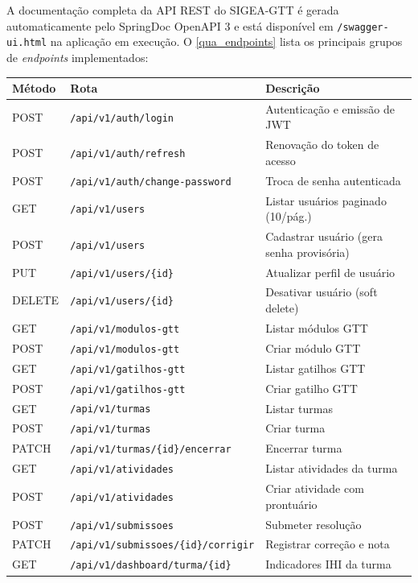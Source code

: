 \begin{apendicesenv}
A documentação completa da API REST do SIGEA-GTT é gerada automaticamente
pelo SpringDoc OpenAPI 3 e está disponível em \texttt{/swagger-ui.html}
na aplicação em execução. O \autoref{qua_endpoints} lista os principais
grupos de \textit{endpoints} implementados:

\begin{quadro}[htb]
\centering
\small
\caption{Principais endpoints da API REST do SIGEA-GTT.}
\label{qua_endpoints}
\begin{tabularx}{\textwidth}{l l X}
\toprule
\textbf{Método} & \textbf{Rota} & \textbf{Descrição} \\
\midrule
POST & \texttt{/api/v1/auth/login} & Autenticação e emissão de JWT \\
POST & \texttt{/api/v1/auth/refresh} & Renovação do token de acesso \\
POST & \texttt{/api/v1/auth/change-password} & Troca de senha autenticada \\
\midrule
GET  & \texttt{/api/v1/users} & Listar usuários paginado (10/pág.) \\
POST & \texttt{/api/v1/users} & Cadastrar usuário (gera senha provisória) \\
PUT  & \texttt{/api/v1/users/\{id\}} & Atualizar perfil de usuário \\
DELETE & \texttt{/api/v1/users/\{id\}} & Desativar usuário (soft delete) \\
\midrule
GET  & \texttt{/api/v1/modulos-gtt} & Listar módulos GTT \\
POST & \texttt{/api/v1/modulos-gtt} & Criar módulo GTT \\
GET  & \texttt{/api/v1/gatilhos-gtt} & Listar gatilhos GTT \\
POST & \texttt{/api/v1/gatilhos-gtt} & Criar gatilho GTT \\
\midrule
GET  & \texttt{/api/v1/turmas} & Listar turmas \\
POST & \texttt{/api/v1/turmas} & Criar turma \\
PATCH & \texttt{/api/v1/turmas/\{id\}/encerrar} & Encerrar turma \\
\midrule
GET  & \texttt{/api/v1/atividades} & Listar atividades da turma \\
POST & \texttt{/api/v1/atividades} & Criar atividade com prontuário \\
\midrule
POST & \texttt{/api/v1/submissoes} & Submeter resolução \\
PATCH & \texttt{/api/v1/submissoes/\{id\}/corrigir} & Registrar correção e nota \\
\midrule
GET  & \texttt{/api/v1/dashboard/turma/\{id\}} & Indicadores IHI da turma \\
\bottomrule
\end{tabularx}
\end{quadro}

\end{apendicesenv}

